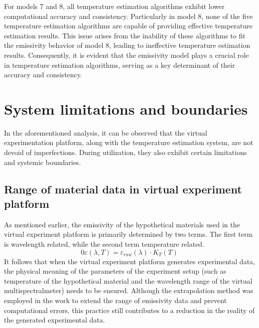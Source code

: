 For models 7 and 8, all temperature estimation algorithms exhibit lower 
computational accuracy and consistency. Particularly in model 8, 
none of the five temperature estimation algorithms are capable of providing 
effective temperature estimation results. This issue arises from the inability 
of these algorithms to fit the emissivity behavior of model 8, leading to 
ineffective temperature estimation results. Consequently, it is evident that the 
emissivity model plays a crucial role in temperature estimation algorithms, 
serving as a key determinant of their accuracy and consistency.


\section{System limitations and boundaries}
In the aforementioned analysis, it can be observed that the virtual 
experimentation platform, along with the temperature estimation system, 
are not devoid of imperfections. During utilization, they also exhibit 
certain limitations and systemic boundaries.


\subsection{Range of material data in virtual experiment platform}
As mentioned earlier, the emissivity of the hypothetical materials used in the virtual experiment 
platform is primarily determined by two terms. The first term is wavelength related, while the 
second term temperature related. 
$$0\varepsilon(\lambda, T) = \varepsilon _{raw}(\lambda) \cdot K_T(T)$$
It follows that when the virtual experiment platform generates 
experimental data, the physical meaning of the parameters of the experiment setup (such as temperature of the hypothetical material 
and the wavelength range of the virtual multispectralmeter) needs to be ensured. 
Although the extrapolation method was employed in the work to extend the range of emissivity data and prevent 
computational errors, this practice still contributes to a reduction in the reality 
of the generated experimental data.

